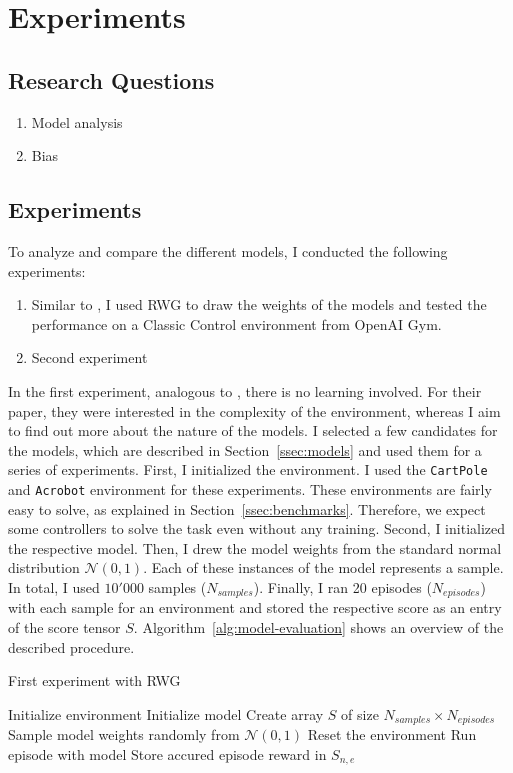 
\chapter{Experiments}
\label{ch:experiments}

\section{Research Questions}
\begin{enumerate}
  \item Model analysis
  \item Bias
\end{enumerate}

\section{Experiments}
To analyze and compare the different models, I conducted the following experiments:
\begin{enumerate}
  \item Similar to \citet{oller_analyzing_2020}, I used RWG to draw the weights of the models and tested the performance on a Classic Control environment from OpenAI Gym.
  \item Second experiment
\end{enumerate}

In the first experiment, analogous to \citet{oller_analyzing_2020}, there is no learning involved. For their paper, they were interested in the complexity of the environment, whereas I aim to find out more about the nature of the models. I selected a few candidates for the models, which are described in Section~\ref{ssec:models} and used them for a series of experiments. First, I initialized the environment. I used the \verb|CartPole| and \verb|Acrobot| environment for these experiments. These environments are fairly easy to solve, as explained in Section~\ref{ssec:benchmarks}. Therefore, we expect some controllers to solve the task even without any training. Second, I initialized the respective model. Then, I drew the model weights from the standard normal distribution $\mathcal{N}(0,1)$. Each of these instances of the model represents a sample. In total, I used $10'000$ samples ($N_{samples}$). Finally, I ran 20 episodes ($N_{episodes}$) with each sample for an environment and stored the respective score as an entry of the score tensor $S$. Algorithm~\ref{alg:model-evaluation} shows an overview of the described procedure.
\begin{algorithm}
\caption{First experiment with RWG}
\begin{algorithmic}[1]
\State Initialize environment
\State Initialize model
\State Create array $S$ of size $N_{samples} \times N_{episodes}$
    \State Sample model weights randomly from $\mathcal{N}(0,1)$
      \State Reset the environment
      \State Run episode with model
      \State Store accured episode reward in $S_{n,e}$
    \EndFor
\EndFor
\end{algorithmic}
\label{alg:model-evaluation}
\end{algorithm}

